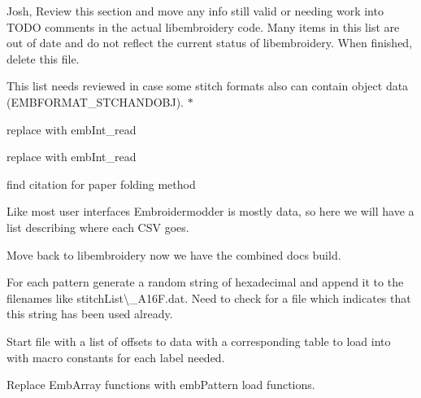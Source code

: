 \begin{DoxyRefList}
\label{todo__todo000199}%
%
Josh, Review this section and move any info still valid or needing work into TODO comments in the actual libembroidery code. Many items in this list are out of date and do not reflect the current status of libembroidery. When finished, delete this file. 
\item[Member \mbox{\hyperlink{formats_8c_a8cb11404ce46501561f956d33f8dcf95}{format\+Table}} \mbox{[}number\+Of\+Formats\mbox{]}]\label{todo__todo000225}%
%
This list needs reviewed in case some stitch formats also can contain object data (EMBFORMAT\+\_\+\+STCHANDOBJ). $\ast$  
\item[Member \mbox{\hyperlink{formats_8c_a05fb50e7292226bc2947dd2b4da7a9bd}{fread\+\_\+int32\+\_\+be}} (FILE $\ast$f)]\label{todo__todo000227}%
%
replace with emb\+Int\+\_\+read  
\item[Member \mbox{\hyperlink{formats_8c_a2bcdb1e6bf6930d5c054ecdca9831eba}{fread\+\_\+uint16}} (FILE $\ast$f)]\label{todo__todo000226}%
%
replace with emb\+Int\+\_\+read  
\item[Member \mbox{\hyperlink{fill_8c_ad02b5d945eacff708d2bf084c40044d8}{generate\+\_\+dragon\+\_\+curve}} (char $\ast$state, int iterations)]\label{todo__todo000220}%
%
find citation for paper folding method  
\item[Page \mbox{\hyperlink{geometry-and-algorithms}{Geometry and Algorithms}} ]\label{todo__todo000207}%
%
Like most user interfaces Embroidermodder is mostly data, so here we will have a list describing where each CSV goes.

\label{todo__todo000211}%
%
Move back to libembroidery now we have the combined docs build.

\label{todo__todo000210}%
%
For each pattern generate a random string of hexadecimal and append it to the filenames like {\ttfamily stitch\+List\textbackslash{}\+\_\+\+A16\+F.\+dat}. Need to check for a file which indicates that this string has been used already.

\label{todo__todo000209}%
%
Start file with a list of offsets to data with a corresponding table to load into with macro constants for each label needed.

\label{todo__todo000208}%
%
Replace Emb\+Array functions with emb\+Pattern load functions.


\end{DoxyRefList}

